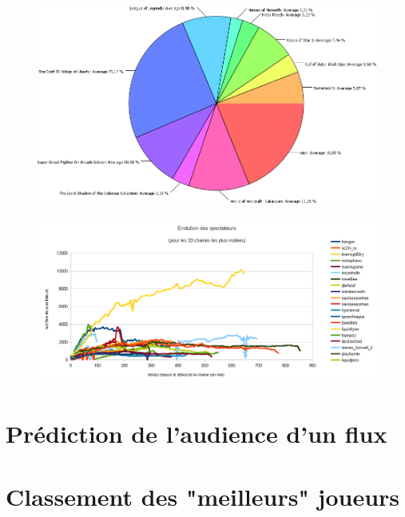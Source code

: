 \documentclass[11pt, a4paper, titlepage]{scrartcl}
\begin{document}
\begin{figure}[h]
    \centering
    \includegraphics[width=\textwidth]{images/main_games}
    \caption{}
\end{figure}

\begin{figure}[h]
    \centering
    \includegraphics[width=\textwidth]{images/top_20_view_evolutions}
    \caption{}
\end{figure}

\section{Prédiction de l'audience d'un flux}


\section{Classement des "meilleurs" joueurs}

\end{document}
